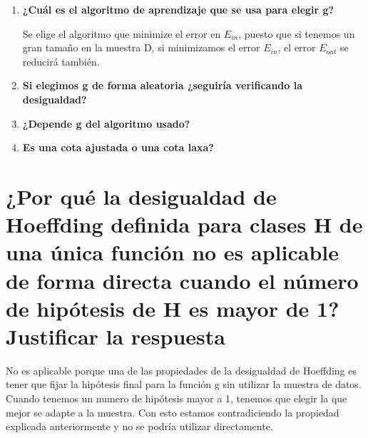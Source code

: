 \documentclass[titlepage]{article}
\begin{document}
  	\begin{enumerate}
  		\item \textbf{¿Cuál es el algoritmo de aprendizaje que se usa para elegir g?}
  		
  		Se elige el algoritmo que minimize el error en $E_{in}$, puesto que si tenemos un gran tamaño en la muestra D, si minimizamos el error $E_{in}$, el error $E_{out}$ se reducirá también.
  		
  		\item \textbf{Si elegimos g de forma aleatoria ¿seguiría verificando la desigualdad?}
  		
  		\item \textbf{¿Depende g del algoritmo usado?}
  		\item \textbf{Es una cota ajustada o una cota laxa?}
  	\end{enumerate}
  	
  	\section{¿Por qué la desigualdad de Hoeffding definida para clases H de una única función no es aplicable de forma directa cuando el número de hipótesis de H es mayor de 1? Justificar la respuesta}
  	
  	No es aplicable porque una de las propiedades de la desigualdad de Hoeffding  es tener que fijar la hipótesis final para la función g sin utilizar la muestra de datos. Cuando tenemos un numero de hipótesis mayor a 1, tenemos que elegir la que mejor se adapte a la muestra. Con esto estamos contradiciendo la propiedad explicada anteriormente y no se podría utilizar directamente.
  	
\end{document}
